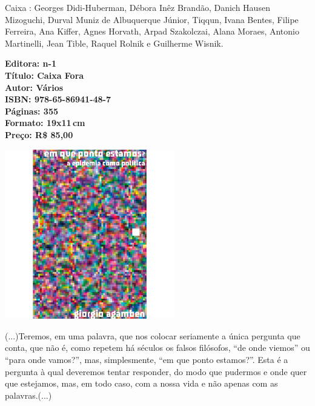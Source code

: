 \hspace*{-7cm}\hrulefill\hspace*{-7cm}

\medskip

\noindent{} Caixa : Georges Didi-Huberman, Débora Inêz Brandão, Danich Hausen Mizoguchi, Durval Muniz de Albuquerque Júnior, Tiqqun, Ivana Bentes, Filipe Ferreira, Ana Kiffer, Agnes Horvath, Arpad Szakolczai, Alana Moraes, Antonio Martinelli, Jean Tible, Raquel Rolnik e Guilherme Wisnik.

\vfill

\hspace*{-.4cm}\begin{minipage}[c]{.5\linewidth}
\small\textbf{
\hspace*{-.1cm}Editora: n-1\\
Título: Caixa Fora\\
Autor: Vários\\
ISBN: 978-65-86941-48-7\\
Páginas: 355\\
Formato: 19x11\,cm\\
Preço: R\$ 85,00\\
}
\end{minipage}

\pagebreak

\begin{center}
\hspace*{.5cm}\includegraphics[width=74mm]{./CAPAS/agamben.jpg}
\end{center}

\hspace*{-7cm}\hrulefill\hspace*{-7cm}

\medskip

\noindent{}(...)Teremos, em uma palavra, que nos colocar seriamente a única pergunta que conta, que não é, como repetem há séculos os falsos filósofos, ``de onde viemos'' ou ``para onde vamos?'', mas, simplesmente, ``em que ponto estamos?''. Esta é a pergunta à qual deveremos tentar responder, do modo que pudermos e onde quer que estejamos, mas, em todo caso, com a nossa vida e não apenas com as palavras.(...)


